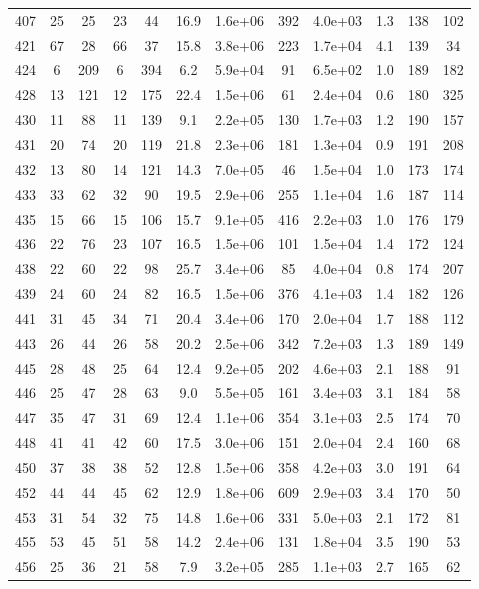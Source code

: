 \begin{table}
\begin{tabular}{cccccccccccc}
407 & 25 & 25 & 23 & 44 & 16.9 & 1.6e+06 & 392 & 4.0e+03 & 1.3 & 138 & 102 \\
421 & 67 & 28 & 66 & 37 & 15.8 & 3.8e+06 & 223 & 1.7e+04 & 4.1 & 139 & 34 \\
424 & 6 & 209 & 6 & 394 & 6.2 & 5.9e+04 & 91 & 6.5e+02 & 1.0 & 189 & 182 \\
428 & 13 & 121 & 12 & 175 & 22.4 & 1.5e+06 & 61 & 2.4e+04 & 0.6 & 180 & 325 \\
430 & 11 & 88 & 11 & 139 & 9.1 & 2.2e+05 & 130 & 1.7e+03 & 1.2 & 190 & 157 \\
431 & 20 & 74 & 20 & 119 & 21.8 & 2.3e+06 & 181 & 1.3e+04 & 0.9 & 191 & 208 \\
432 & 13 & 80 & 14 & 121 & 14.3 & 7.0e+05 & 46 & 1.5e+04 & 1.0 & 173 & 174 \\
433 & 33 & 62 & 32 & 90 & 19.5 & 2.9e+06 & 255 & 1.1e+04 & 1.6 & 187 & 114 \\
435 & 15 & 66 & 15 & 106 & 15.7 & 9.1e+05 & 416 & 2.2e+03 & 1.0 & 176 & 179 \\
436 & 22 & 76 & 23 & 107 & 16.5 & 1.5e+06 & 101 & 1.5e+04 & 1.4 & 172 & 124 \\
438 & 22 & 60 & 22 & 98 & 25.7 & 3.4e+06 & 85 & 4.0e+04 & 0.8 & 174 & 207 \\
439 & 24 & 60 & 24 & 82 & 16.5 & 1.5e+06 & 376 & 4.1e+03 & 1.4 & 182 & 126 \\
441 & 31 & 45 & 34 & 71 & 20.4 & 3.4e+06 & 170 & 2.0e+04 & 1.7 & 188 & 112 \\
443 & 26 & 44 & 26 & 58 & 20.2 & 2.5e+06 & 342 & 7.2e+03 & 1.3 & 189 & 149 \\
445 & 28 & 48 & 25 & 64 & 12.4 & 9.2e+05 & 202 & 4.6e+03 & 2.1 & 188 & 91 \\
446 & 25 & 47 & 28 & 63 & 9.0 & 5.5e+05 & 161 & 3.4e+03 & 3.1 & 184 & 58 \\
447 & 35 & 47 & 31 & 69 & 12.4 & 1.1e+06 & 354 & 3.1e+03 & 2.5 & 174 & 70 \\
448 & 41 & 41 & 42 & 60 & 17.5 & 3.0e+06 & 151 & 2.0e+04 & 2.4 & 160 & 68 \\
450 & 37 & 38 & 38 & 52 & 12.8 & 1.5e+06 & 358 & 4.2e+03 & 3.0 & 191 & 64 \\
452 & 44 & 44 & 45 & 62 & 12.9 & 1.8e+06 & 609 & 2.9e+03 & 3.4 & 170 & 50 \\
453 & 31 & 54 & 32 & 75 & 14.8 & 1.6e+06 & 331 & 5.0e+03 & 2.1 & 172 & 81 \\
455 & 53 & 45 & 51 & 58 & 14.2 & 2.4e+06 & 131 & 1.8e+04 & 3.5 & 190 & 53 \\
456 & 25 & 36 & 21 & 58 & 7.9 & 3.2e+05 & 285 & 1.1e+03 & 2.7 & 165 & 62 \\

\end{tabular}
\end{table}
